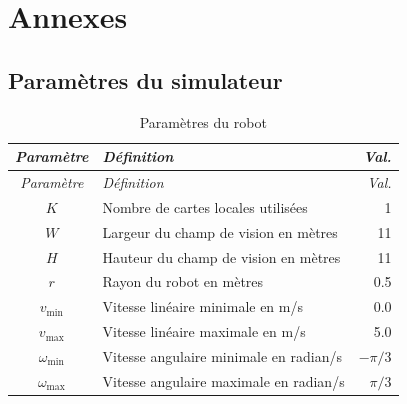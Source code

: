 \appendix
\section{Annexes}


\subsection{Paramètres du simulateur}

\begin{longtable}{cp{11cm}r}

    \caption{Paramètres du robot}
    \label{tab:robot_parameters}                                                   \\
    \toprule
    \textit{Paramètre}    & \textit{Définition}                    & \textit{Val.} \\
    \midrule
    \endfirsthead
    \toprule
    \textit{Paramètre}    & \textit{Définition}                    & \textit{Val.} \\
    \midrule
    \endhead
    \midrule
    \endfoot
    \bottomrule
    \endlastfoot

    $K$                   & Nombre de cartes locales utilisées     & 1             \\
    $W$                   & Largeur du champ de vision en mètres   & 11            \\
    $H$                   & Hauteur du champ de vision en mètres   & 11            \\
    \midrule
    $r$                   & Rayon du robot en mètres               & 0.5           \\
    $v_{\text{min}}$      & Vitesse linéaire minimale en m/s       & 0.0           \\
    $v_{\text{max}}$      & Vitesse linéaire maximale en m/s       & 5.0           \\
    $\omega_{\text{min}}$ & Vitesse angulaire minimale en radian/s & $-\pi/3$      \\
    $\omega_{\text{max}}$ & Vitesse angulaire maximale en radian/s & $\pi/3$       \\
\end{longtable}

